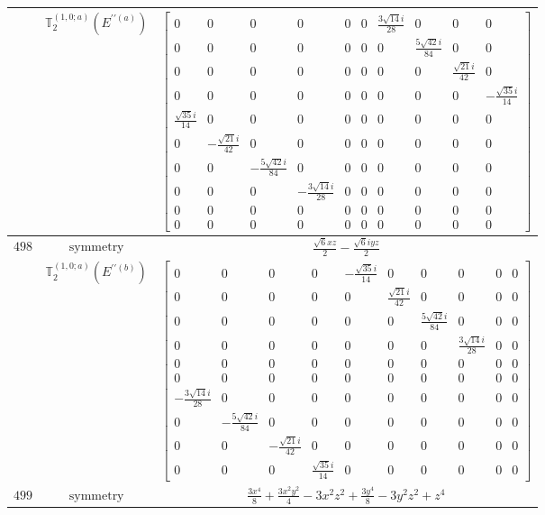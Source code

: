\documentclass[fleqn,8pt,landscape]{jsarticle}
\begin{document}
\begin{longtable}{ccc}
$  $ & $ \mathbb{T}_{2}^{(1,0;a)}(E^{\prime\prime(a)}) $ & $ \begin{bmatrix} 0 & 0 & 0 & 0 & 0 & 0 & \frac{3 \sqrt{14} i}{28} & 0 & 0 & 0 \\ 0 & 0 & 0 & 0 & 0 & 0 & 0 & \frac{5 \sqrt{42} i}{84} & 0 & 0 \\ 0 & 0 & 0 & 0 & 0 & 0 & 0 & 0 & \frac{\sqrt{21} i}{42} & 0 \\ 0 & 0 & 0 & 0 & 0 & 0 & 0 & 0 & 0 & - \frac{\sqrt{35} i}{14} \\ \frac{\sqrt{35} i}{14} & 0 & 0 & 0 & 0 & 0 & 0 & 0 & 0 & 0 \\ 0 & - \frac{\sqrt{21} i}{42} & 0 & 0 & 0 & 0 & 0 & 0 & 0 & 0 \\ 0 & 0 & - \frac{5 \sqrt{42} i}{84} & 0 & 0 & 0 & 0 & 0 & 0 & 0 \\ 0 & 0 & 0 & - \frac{3 \sqrt{14} i}{28} & 0 & 0 & 0 & 0 & 0 & 0 \\ 0 & 0 & 0 & 0 & 0 & 0 & 0 & 0 & 0 & 0 \\ 0 & 0 & 0 & 0 & 0 & 0 & 0 & 0 & 0 & 0 \end{bmatrix} $ \\ \hline
$ 498 $ & $ \text{symmetry} $ & $ \frac{\sqrt{6} x z}{2} - \frac{\sqrt{6} i y z}{2} $ \\
$  $ & $ \mathbb{T}_{2}^{(1,0;a)}(E^{\prime\prime(b)}) $ & $ \begin{bmatrix} 0 & 0 & 0 & 0 & - \frac{\sqrt{35} i}{14} & 0 & 0 & 0 & 0 & 0 \\ 0 & 0 & 0 & 0 & 0 & \frac{\sqrt{21} i}{42} & 0 & 0 & 0 & 0 \\ 0 & 0 & 0 & 0 & 0 & 0 & \frac{5 \sqrt{42} i}{84} & 0 & 0 & 0 \\ 0 & 0 & 0 & 0 & 0 & 0 & 0 & \frac{3 \sqrt{14} i}{28} & 0 & 0 \\ 0 & 0 & 0 & 0 & 0 & 0 & 0 & 0 & 0 & 0 \\ 0 & 0 & 0 & 0 & 0 & 0 & 0 & 0 & 0 & 0 \\ - \frac{3 \sqrt{14} i}{28} & 0 & 0 & 0 & 0 & 0 & 0 & 0 & 0 & 0 \\ 0 & - \frac{5 \sqrt{42} i}{84} & 0 & 0 & 0 & 0 & 0 & 0 & 0 & 0 \\ 0 & 0 & - \frac{\sqrt{21} i}{42} & 0 & 0 & 0 & 0 & 0 & 0 & 0 \\ 0 & 0 & 0 & \frac{\sqrt{35} i}{14} & 0 & 0 & 0 & 0 & 0 & 0 \end{bmatrix} $ \\ \hline
$ 499 $ & $ \text{symmetry} $ & $ \frac{3 x^{4}}{8} + \frac{3 x^{2} y^{2}}{4} - 3 x^{2} z^{2} + \frac{3 y^{4}}{8} - 3 y^{2} z^{2} + z^{4} $ \\

\end{longtable}
\end{document}
